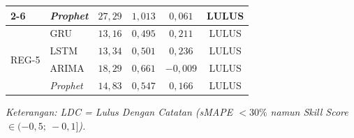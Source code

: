 \begin{table}[htbp]
\begin{tabular}{|p{2.2cm}|p{1.5cm}|c|c|c|c|}
\cline{2-6}
 & \textit{Prophet} & $27{,}29$ & $1{,}013$ & $0{,}061$ & LULUS \\
\hline
\multirow{4}{*}{REG-5} & GRU & $13{,}16$ & $0{,}495$ & $0{,}211$ & LULUS \\
\cline{2-6}
 & LSTM & $13{,}34$ & $0{,}501$ & $0{,}236$ & LULUS \\
\cline{2-6}
 & ARIMA & $18{,}29$ & $0{,}661$ & $-0{,}009$ & LULUS \\
\cline{2-6}
 & \textit{Prophet} & $14{,}83$ & $0{,}547$ & $0{,}166$ & LULUS \\
\hline
\end{tabular}
\begin{flushleft}
\footnotesize\textit{Keterangan: LDC = Lulus Dengan Catatan (sMAPE $< 30\%$ namun \textit{Skill Score} $\in (-0{,}5;\ -0{,}1]$).}
\end{flushleft}
\end{table}
